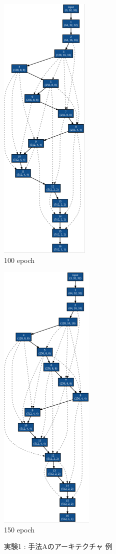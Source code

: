 \begin{figure}[tb]
\begin{minipage}{0.3\hsize}
\begin{center}
    \includegraphics[clip,scale=0.8]{./fig/04.exp/a100.png}\\
    100 epoch
 	\end{center}
 \end{minipage}
 \begin{minipage}{0.3\hsize}
 	\begin{center}
    \includegraphics[clip,scale=0.8]{./fig/04.exp/a150.png}\\
    150 epoch
 	\end{center}
 \end{minipage}
 \caption{実験1 : 手法Aのアーキテクチャ 例}
 \label{fig:exp1_a}
\end{figure}


